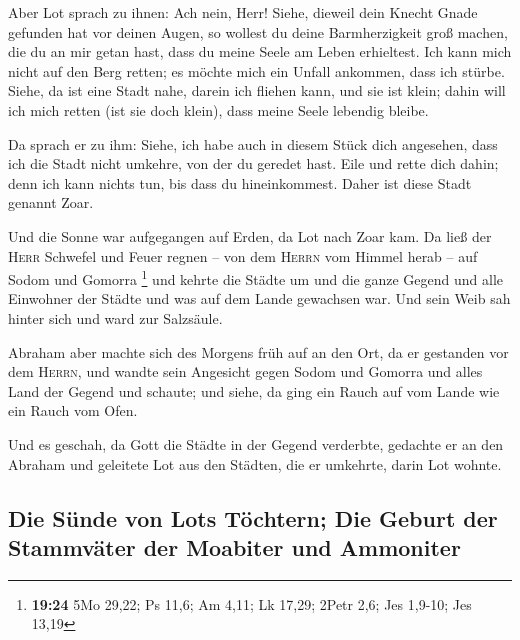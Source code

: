  Aber Lot sprach zu ihnen: Ach nein, Herr!
 Siehe, dieweil dein Knecht Gnade gefunden hat vor deinen
Augen, so wollest du deine Barmherzigkeit groß machen, die du an mir
getan hast, dass du meine Seele am Leben erhieltest. Ich kann mich nicht
auf den Berg retten; es möchte mich ein Unfall ankommen, dass ich
stürbe.  Siehe, da ist eine Stadt nahe, darein ich
fliehen kann, und sie ist klein; dahin will ich mich retten (ist sie
doch klein), dass meine Seele lebendig bleibe.

 Da sprach er zu ihm: Siehe, ich habe auch in diesem
Stück dich angesehen, dass ich die Stadt nicht umkehre, von der du
geredet hast.  Eile und rette dich dahin; denn ich kann
nichts tun, bis dass du hineinkommest. Daher ist diese Stadt genannt
Zoar.

 Und die Sonne war aufgegangen auf Erden, da Lot nach
Zoar kam.  Da ließ der \textsc{Herr} Schwefel und Feuer
regnen -- von dem \textsc{Herrn} vom Himmel herab -- auf Sodom und
Gomorra \footnote{\textbf{19:24} 5Mo 29,22; Ps 11,6; Am 4,11; Lk 17,29;
  2Petr 2,6; Jes 1,9-10; Jes 13,19}  und kehrte die
Städte um und die ganze Gegend und alle Einwohner der Städte und was auf
dem Lande gewachsen war.  Und sein Weib sah hinter sich
und ward zur Salzsäule.

 Abraham aber machte sich des Morgens früh auf an den
Ort, da er gestanden vor dem \textsc{Herrn},  und wandte
sein Angesicht gegen Sodom und Gomorra und alles Land der Gegend und
schaute; und siehe, da ging ein Rauch auf vom Lande wie ein Rauch vom
Ofen.

 Und es geschah, da Gott die Städte in der Gegend
verderbte, gedachte er an den Abraham und geleitete Lot aus den Städten,
die er umkehrte, darin Lot wohnte.

\hypertarget{die-suxfcnde-von-lots-tuxf6chtern-die-geburt-der-stammvuxe4ter-der-moabiter-und-ammoniter}{%
\subsection{Die Sünde von Lots Töchtern; Die Geburt der Stammväter der
Moabiter und
Ammoniter}\label{die-suxfcnde-von-lots-tuxf6chtern-die-geburt-der-stammvuxe4ter-der-moabiter-und-ammoniter}}

